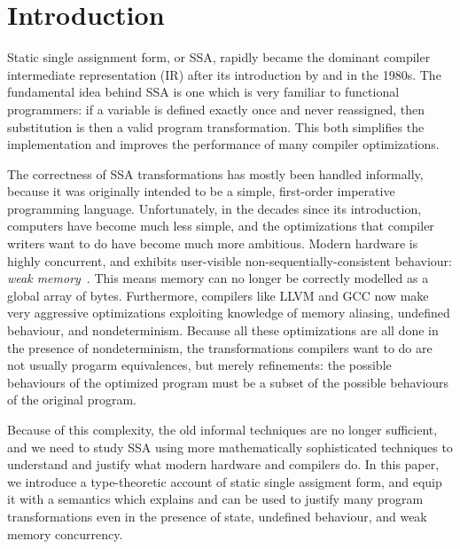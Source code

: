 \documentclass[acmsmall,screen,review]{acmart}
\begin{document}
\maketitle

\section{Introduction}

Static single assignment form, or SSA, rapidly became the dominant compiler intermediate
representation (IR) after its introduction by \citet{alpern-ssa-original-88} and
\citet{rosen-gvn-1988} in the 1980s. The fundamental idea behind SSA is one which is very familiar
to functional programmers: if a variable is defined exactly once and never reassigned, then
substitution is then a valid program transformation. This both simplifies the implementation and
improves the performance of many compiler optimizations.

The correctness of SSA transformations has mostly been handled informally, because it was originally
intended to be a simple, first-order imperative programming language. Unfortunately, in the decades
since its introduction, computers have become much less simple, and the optimizations that compiler
writers want to do have become much more ambitious. Modern hardware is highly concurrent, and
exhibits user-visible non-sequentially-consistent behaviour: \emph{weak
memory}~\cite{batty-compositional-17}. This means memory can no longer be correctly modelled as a
global array of bytes. Furthermore, compilers like LLVM and GCC now make very aggressive
optimizations exploiting knowledge of memory aliasing, undefined behaviour, and nondeterminism.
Because all these optimizations are all done in the presence of nondeterminism, the transformations
compilers want to do are not usually progarm equivalences, but merely refinements: the possible
behaviours of the optimized program must be a subset of the possible behaviours of the original
program. 

Because of this complexity, the old informal techniques are no longer sufficient, and we need to study SSA using more mathematically sophisticated techniques to understand and justify what modern hardware and compilers do. In this paper, we introduce a type-theoretic account of static single assigment form, and equip it with a semantics which explains and can be used to justify many program transformations even in the presence of state, undefined behaviour, and weak memory concurrency. 
\end{document}
